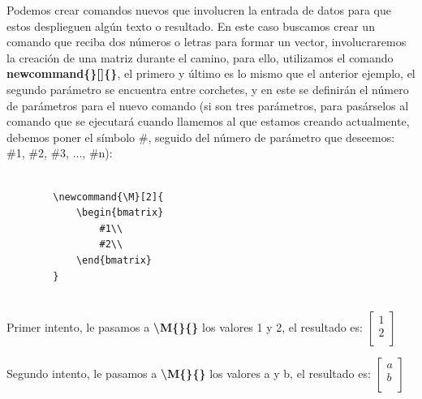 Podemos crear comandos nuevos que involucren la entrada de datos para que estos desplieguen algún texto o resultado. En este caso buscamos crear un comando que reciba dos números o letras para formar un vector, involucraremos la creación de una matriz durante el camino, para ello, utilizamos el comando \textbf{newcommand\{\}[]\{\}}, el primero y último es lo mismo que el anterior ejemplo, el segundo parámetro se encuentra entre corchetes, y en este se definirán el número de parámetros para el nuevo comando (si son tres parámetros, para pasárselos al comando que se ejecutará cuando llamemos al que estamos creando actualmente, debemos poner el símbolo \#, seguido del número de parámetro que deseemos: \#1, \#2, \#3, ..., \#n):
\begin{lstlisting}
    
        \newcommand{\M}[2]{
            \begin{bmatrix}
	            #1\\
	            #2\\
            \end{bmatrix}
        }
    
\end{lstlisting}
\newcommand{\M}[2]{\begin{bmatrix}
	#1\\
	#2\\
\end{bmatrix}
}

Primer intento, le pasamos a \textbf{\textbackslash{M\{\}\{\}}} los valores 1 y 2, el resultado es: $\M{1}{2}$

Segundo intento, le pasamos a \textbf{\textbackslash{M\{\}\{\}}} los valores a y b, el resultado es: $\M{a}{b}$

